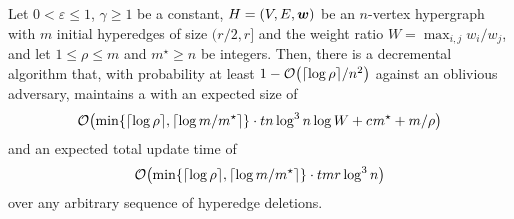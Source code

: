 \begin{lemma} \label{lem:decremental_spectral_sparsify}
Let \( 0 < \varepsilon \leq 1 \), \( \gamma \geq 1 \) be a constant,  \( { H} = (V, E, \boldsymbol{w}) \) be an \( n \)-vertex hypergraph with \( m \) initial hyperedges of size \( (r/2, r] \) and the weight ratio \( W = \max _{i,j} w_i / w_j \), and let \( 1 \leq \rho \leq m \) and \( m^\star \geq n \) be integers.
Then, there is a decremental algorithm that, with probability at least \( 1 - \atmost{ \lceil \log \rho \rceil /n^2} \) against an oblivious adversary, maintains a \SpectralHypersparsifier{} with an expected size of 
\begin{equation*}
\atmost{
\min\left\{ \lceil \log \rho \rceil, \lceil \log m / m^\star \rceil \right\}
\cdot
t n \log ^3 n \log W + \ConstantSize m^\star + m/\rho
}
\end{equation*}
and an expected total update time of 
\begin{equation*}
\atmost{
\min\left\{ \lceil \log \rho \rceil, \lceil \log m / m^\star \rceil \right\}
\cdot
t m r \log ^3 n 
}
\end{equation*}
over any arbitrary sequence of  hyperedge deletions.
\end{lemma}

